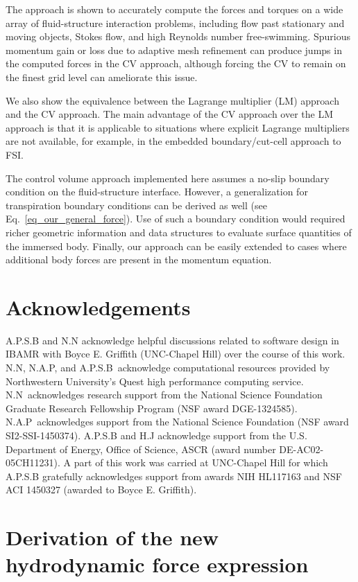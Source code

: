\documentclass[review]{elsarticle}
\begin{document}
The approach is shown to accurately compute the forces and torques on a wide array
of fluid-structure interaction problems, including flow past stationary and moving objects, 
Stokes flow, and high Reynolds number free-swimming. Spurious momentum gain or loss
due to adaptive mesh refinement can produce jumps in the computed forces in the CV
approach, although forcing the CV to remain on the finest grid level can ameliorate this issue. 

We also show the equivalence between the Lagrange multiplier (LM) approach and the CV approach.
The main advantage of the CV approach over the LM approach is that it is applicable
to situations where explicit Lagrange multipliers are not available, for example, in the embedded
boundary/cut-cell approach to FSI. 

The control volume approach implemented here assumes a no-slip boundary condition on the fluid-structure
interface. However, a generalization for transpiration boundary conditions can be derived as well (see
Eq.~\eqref{eq_our_general_force}). Use of such a boundary condition would required richer geometric 
information and data structures to evaluate surface quantities of the immersed body. Finally, our approach 
can be easily extended to cases where additional body forces are present in the momentum equation.

\section*{Acknowledgements}
A.P.S.B and N.N acknowledge helpful discussions related to software design in IBAMR 
with Boyce E. Griffith (UNC-Chapel Hill) over the course of this work.  
N.N, N.A.P, and A.P.S.B~acknowledge computational resources
provided by Northwestern University's Quest high performance computing
service.  N.N~acknowledges research support from the National Science Foundation 
Graduate Research Fellowship Program (NSF award DGE-1324585).
N.A.P~acknowledges support from the National Science Foundation (NSF award SI2-SSI-1450374).
A.P.S.B and H.J acknowledge support from the U.S. Department of Energy, Office of Science, 
ASCR (award number DE-AC02-05CH11231). A part of this work was carried at UNC-Chapel Hill for 
which A.P.S.B gratefully acknowledges support from awards NIH HL117163 and NSF ACI 1450327 
(awarded to Boyce E. Griffith). 

\appendix 

\section{Derivation of the new hydrodynamic force expression} \label{app_force}
\end{document}
